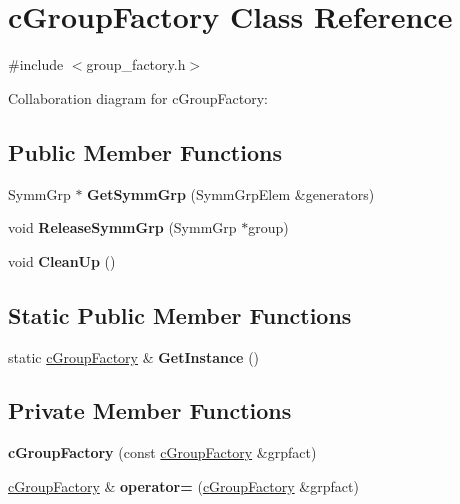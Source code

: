 \hypertarget{classcGroupFactory}{\section{c\-Group\-Factory Class Reference}
\label{classcGroupFactory}
}


{\ttfamily \#include $<$group\-\_\-factory.\-h$>$}



Collaboration diagram for c\-Group\-Factory\-:
\subsection*{Public Member Functions}
\begin{DoxyCompactItemize}
\item 
\hypertarget{classcGroupFactory_a079cb48ea3b9cf70b5c1af7537d5a2bb}{Symm\-Grp $\ast$ {\bfseries Get\-Symm\-Grp} (Symm\-Grp\-Elem \&generators)}\label{classcGroupFactory_a079cb48ea3b9cf70b5c1af7537d5a2bb}

\item 
\hypertarget{classcGroupFactory_a1f976090fb1ff95d94fca1eed602382d}{void {\bfseries Release\-Symm\-Grp} (Symm\-Grp $\ast$group)}\label{classcGroupFactory_a1f976090fb1ff95d94fca1eed602382d}

\item 
\hypertarget{classcGroupFactory_a1158bb4ce7d48072e10dc81c92739ae3}{void {\bfseries Clean\-Up} ()}\label{classcGroupFactory_a1158bb4ce7d48072e10dc81c92739ae3}

\end{DoxyCompactItemize}
\subsection*{Static Public Member Functions}
\begin{DoxyCompactItemize}
\item 
\hypertarget{classcGroupFactory_ae36952cd3999d331756a75a776e7a447}{static \hyperlink{classcGroupFactory}{c\-Group\-Factory} \& {\bfseries Get\-Instance} ()}\label{classcGroupFactory_ae36952cd3999d331756a75a776e7a447}

\end{DoxyCompactItemize}
\subsection*{Private Member Functions}
\begin{DoxyCompactItemize}
\item 
\hypertarget{classcGroupFactory_a7574dae0e4a358211ce79adf75a39ed2}{{\bfseries c\-Group\-Factory} (const \hyperlink{classcGroupFactory}{c\-Group\-Factory} \&grpfact)}\label{classcGroupFactory_a7574dae0e4a358211ce79adf75a39ed2}

\item 
\hypertarget{classcGroupFactory_a1c4edf0b35f3152a618f275bf459e7f3}{\hyperlink{classcGroupFactory}{c\-Group\-Factory} \& {\bfseries operator=} (\hyperlink{classcGroupFactory}{c\-Group\-Factory} \&grpfact)}\label{classcGroupFactory_a1c4edf0b35f3152a618f275bf459e7f3}

\end{DoxyCompactItemize}
